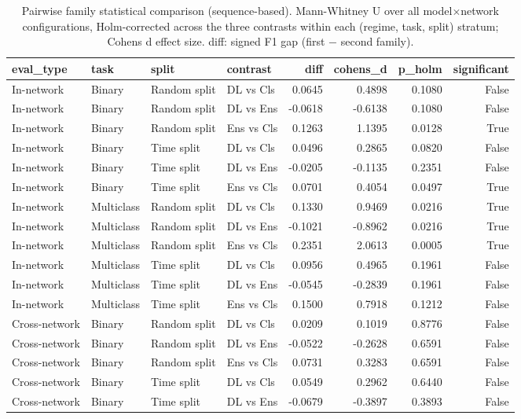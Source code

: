 \begin{table}
\caption{Pairwise family statistical comparison (sequence-based). Mann-Whitney U over all model$\times$network configurations, Holm-corrected across the three contrasts within each (regime, task, split) stratum; Cohens d effect size. diff: signed F1 gap (first $-$ second family).}
\label{tab:q6_stats}
\begin{tabular}{llllrrrr}
\toprule
eval_type & task & split & contrast & diff & cohens_d & p_holm & significant \\
\midrule
In-network & Binary & Random split & DL vs Cls & 0.0645 & 0.4898 & 0.1080 & False \\
In-network & Binary & Random split & DL vs Ens & -0.0618 & -0.6138 & 0.1080 & False \\
In-network & Binary & Random split & Ens vs Cls & 0.1263 & 1.1395 & 0.0128 & True \\
In-network & Binary & Time split & DL vs Cls & 0.0496 & 0.2865 & 0.0820 & False \\
In-network & Binary & Time split & DL vs Ens & -0.0205 & -0.1135 & 0.2351 & False \\
In-network & Binary & Time split & Ens vs Cls & 0.0701 & 0.4054 & 0.0497 & True \\
In-network & Multiclass & Random split & DL vs Cls & 0.1330 & 0.9469 & 0.0216 & True \\
In-network & Multiclass & Random split & DL vs Ens & -0.1021 & -0.8962 & 0.0216 & True \\
In-network & Multiclass & Random split & Ens vs Cls & 0.2351 & 2.0613 & 0.0005 & True \\
In-network & Multiclass & Time split & DL vs Cls & 0.0956 & 0.4965 & 0.1961 & False \\
In-network & Multiclass & Time split & DL vs Ens & -0.0545 & -0.2839 & 0.1961 & False \\
In-network & Multiclass & Time split & Ens vs Cls & 0.1500 & 0.7918 & 0.1212 & False \\
Cross-network & Binary & Random split & DL vs Cls & 0.0209 & 0.1019 & 0.8776 & False \\
Cross-network & Binary & Random split & DL vs Ens & -0.0522 & -0.2628 & 0.6591 & False \\
Cross-network & Binary & Random split & Ens vs Cls & 0.0731 & 0.3283 & 0.6591 & False \\
Cross-network & Binary & Time split & DL vs Cls & 0.0549 & 0.2962 & 0.6440 & False \\
Cross-network & Binary & Time split & DL vs Ens & -0.0679 & -0.3897 & 0.3893 & False \\

\end{tabular}
\end{table}
